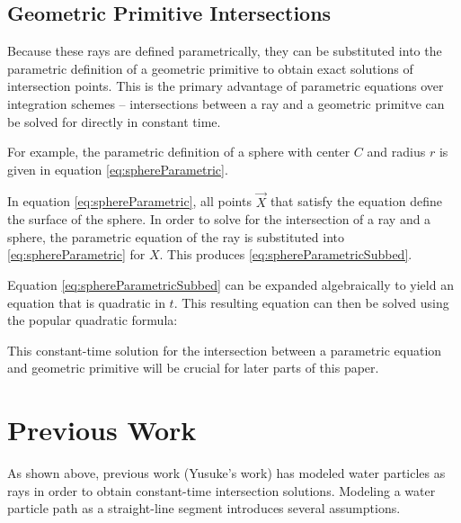	\subsection{Geometric Primitive Intersections}

Because these rays are defined parametrically, they can be substituted into the parametric definition of a geometric primitive to obtain exact solutions of intersection points. This is the primary advantage of parametric equations over integration schemes -- intersections between a ray and a geometric primitve can be solved for directly in constant time. 

For example, the parametric definition of a sphere with center $C$ and radius $r$ is given in equation \eqref{eq:sphereParametric}.

 {
	\label{eq:sphereParametric}
}

In equation \eqref{eq:sphereParametric}, all points $\vec{X}$ that satisfy the equation define the surface of the sphere. In order to solve for the intersection of a ray and a sphere, the parametric equation of the ray is substituted into \eqref{eq:sphereParametric} for $X$. This produces \eqref{eq:sphereParametricSubbed}.

 {
	\label{eq:sphereParametricSubbed}
}


Equation \eqref{eq:sphereParametricSubbed} can be expanded algebraically to yield an equation that is quadratic in $t$. This resulting equation can then be solved using the popular quadratic formula:

 {
	\label{eq:quadraticFormula} 
}

This constant-time solution for the intersection between a parametric equation and geometric primitive will be crucial for later parts of this paper.

\section{Previous Work}

As shown above, previous work (Yusuke's work) has modeled water particles as rays in order to obtain constant-time intersection solutions. Modeling a water particle path as a straight-line segment introduces several assumptions.

